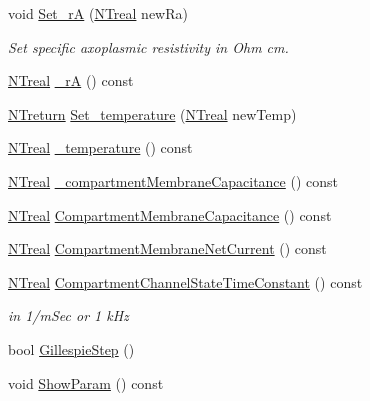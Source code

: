 \begin{DoxyCompactItemize}
void \hyperlink{class_n_t_b_p__membrane__compartment__o_a98c50edeb827e515ade79260d64738b0}{Set\_\-rA} (\hyperlink{nt__types_8h_a814a97893e9deb1eedcc7604529ba80d}{NTreal} newRa)
\begin{DoxyCompactList}\small\item\em Set specific axoplasmic resistivity in Ohm cm. \item\end{DoxyCompactList}\item 
\hyperlink{nt__types_8h_a814a97893e9deb1eedcc7604529ba80d}{NTreal} \hyperlink{class_n_t_b_p__membrane__compartment__o_ac6ce1d05339d8c689d1ee85d6ac9fbd1}{\_\-rA} () const 
\item 
\hyperlink{nt__types_8h_ab9564ee8f091e809d21b8451c6683c53}{NTreturn} \hyperlink{class_n_t_b_p__membrane__compartment__o_a095a9b05fe24fbf525a95848815abeed}{Set\_\-temperature} (\hyperlink{nt__types_8h_a814a97893e9deb1eedcc7604529ba80d}{NTreal} newTemp)
\item 
\hyperlink{nt__types_8h_a814a97893e9deb1eedcc7604529ba80d}{NTreal} \hyperlink{class_n_t_b_p__membrane__compartment__o_a3f457fa5e1284d73b13fb80ee2707a7f}{\_\-temperature} () const 
\item 
\hyperlink{nt__types_8h_a814a97893e9deb1eedcc7604529ba80d}{NTreal} \hyperlink{class_n_t_b_p__membrane__compartment__o_a7a830113271e7694e283b2435a885cc1}{\_\-compartmentMembraneCapacitance} () const 
\item 
\hyperlink{nt__types_8h_a814a97893e9deb1eedcc7604529ba80d}{NTreal} \hyperlink{class_n_t_b_p__membrane__compartment__o_ab2bc52b03d7c618b2365f9cd189f9954}{CompartmentMembraneCapacitance} () const 
\item 
\hyperlink{nt__types_8h_a814a97893e9deb1eedcc7604529ba80d}{NTreal} \hyperlink{class_n_t_b_p__membrane__compartment__o_a7ed84daab7d339afe27f5b14f295d100}{CompartmentMembraneNetCurrent} () const 
\item 
\hyperlink{nt__types_8h_a814a97893e9deb1eedcc7604529ba80d}{NTreal} \hyperlink{class_n_t_b_p__membrane__compartment__o_ab91c31374f70343331d803de7146e063}{CompartmentChannelStateTimeConstant} () const 
\begin{DoxyCompactList}\small\item\em in 1/mSec or 1 kHz \item\end{DoxyCompactList}\item 
bool \hyperlink{class_n_t_b_p__membrane__compartment__o_a21b8ebe76e52a6536e91d39e00970c5a}{GillespieStep} ()
\item 
void \hyperlink{class_n_t_b_p__membrane__compartment__o_a1fd25dfbc4f3baba157d0cfab6786e8c}{ShowParam} () const 
\end{DoxyCompactItemize}
